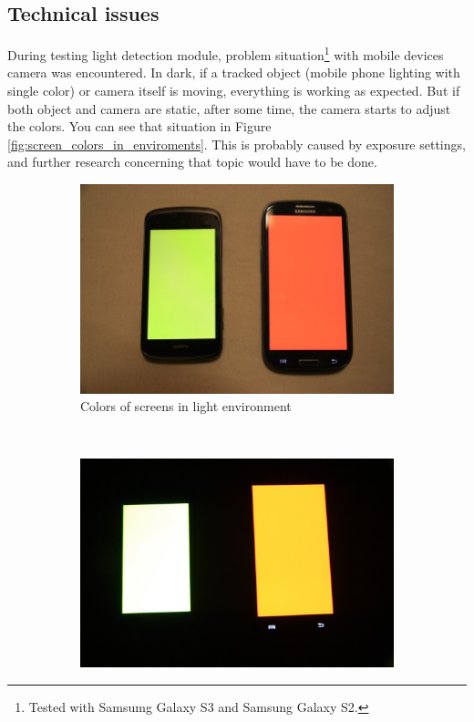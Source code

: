 \subsection{Technical issues}
During testing light detection module, problem situation\footnote{Tested with Samsumg Galaxy S3 and Samsung Galaxy S2.} with mobile devices camera was encountered.
In dark, if a tracked object (mobile phone lighting with single color) or camera itself is moving, everything is working as expected.
But if both object and camera are static, after some time, the camera starts to adjust the colors.
You can see that situation in Figure \ref{fig:screen_colors_in_enviroments}.
This is probably caused by exposure settings, and further research concerning that topic would have to be done.
\begin{figure}[h]
        \centering
        \begin{subfigure}[b]{0.4\textwidth}
                \includegraphics[width=\textwidth]{evaluation/IMG_7029.JPG}
                \caption{Colors of screens in light environment}
                \label{fig:tiger}
        \end{subfigure}
        ~ %
        \begin{subfigure}[b]{0.4\textwidth}
                \includegraphics[width=\textwidth]{evaluation/IMG_7032.JPG}

\end{subfigure}
\end{figure}
